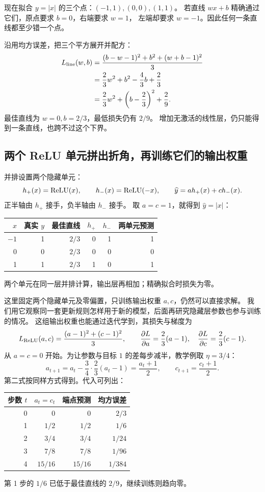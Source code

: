 现在拟合 $y=|x|$ 的三个点：$(-1,1),(0,0),(1,1)$。
若直线 $wx+b$ 精确通过它们，原点要求 $b=0$，右端要求 $w=1$，
左端却要求 $w=-1$。因此任何一条直线都至少错一个点。

沿用均方误差，把三个平方展开并配方：
\[
\begin{aligned}
L_{\rm line}(w,b)&=\frac{(b-w-1)^2+b^2+(w+b-1)^2}{3}\\
&=\frac23w^2+b^2-\frac43b+\frac23\\
&=\frac23w^2+\left(b-\frac23\right)^2+\frac29.
\end{aligned}
\]
最佳直线为 $w=0,b=2/3$，最低损失仍有 $2/9$。
增加无激活的线性层，仍只能得到一条直线，也跨不过这个下界。

\subsection{两个 ReLU 单元拼出折角，再训练它们的输出权重}

并排设置两个隐藏单元：
\[
h_+(x)=\operatorname{ReLU}(x),\qquad h_-(x)=\operatorname{ReLU}(-x),\qquad
\widehat{y}=a h_+(x)+c h_-(x).
\]
正半轴由 $h_+$ 接手，负半轴由 $h_-$ 接手。
取 $a=c=1$，就得到 $\widehat{y}=|x|$：
\begin{center}\small
{}
\begin{tabular}{rrrrrr}
\toprule
$x$ & 真实 $y$ & 最佳直线 & $h_+$ & $h_-$ & 两单元预测\\\midrule
$-1$ & 1 & $2/3$ & 0 & 1 & 1\\
0 & 0 & $2/3$ & 0 & 0 & 0\\
1 & 1 & $2/3$ & 1 & 0 & 1\\
\bottomrule\end{tabular}
\end{center}
两个单元在同一层并排计算，输出层再相加；精确拟合时损失为零。


这里固定两个隐藏单元及零偏置，只训练输出权重 $a,c$，仍然可以直接求解。
我们用它观察同一套更新规则怎样用于新的模型，后面再研究隐藏层参数也参与训练的情况。
这组输出权重也能通过迭代学到，其损失与梯度为
\[
L_{\rm ReLU}(a,c)=\frac{(a-1)^2+(c-1)^2}{3},\qquad
\frac{\partial L}{\partial a}=\frac23(a-1),\quad
\frac{\partial L}{\partial c}=\frac23(c-1).
\]
从 $a=c=0$ 开始。为让参数与目标 $1$ 的差每步减半，教学例取 $\eta=3/4$：
\[
a_{t+1}=a_t-\frac34\cdot\frac23(a_t-1)=\frac{a_t+1}{2},\qquad
c_{t+1}=\frac{c_t+1}{2}.
\]
第二式按同样方式得到。代入可列出：
\begin{center}\small
{}
\begin{tabular}{rrrr}
\toprule
步数 $t$ & $a_t=c_t$ & 端点预测 & 均方误差\\\midrule
0 & 0 & 0 & $2/3$\\
1 & $1/2$ & $1/2$ & $1/6$\\
2 & $3/4$ & $3/4$ & $1/24$\\
3 & $7/8$ & $7/8$ & $1/96$\\
4 & $15/16$ & $15/16$ & $1/384$\\
\bottomrule\end{tabular}
\end{center}
第 1 步的 $1/6$ 已低于最佳直线的 $2/9$，继续训练则趋向零。

